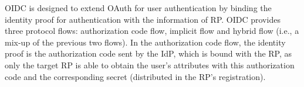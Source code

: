 

OIDC is designed to extend OAuth for user authentication by binding the identity proof for authentication with the information of RP. OIDC provides three protocol flows: authorization code flow, implicit flow and hybrid flow (i.e., a mix-up of the previous two flows). In the authorization code flow, the identity proof is the authorization code sent by the IdP, which is bound with the RP, as only the target RP is able to obtain the user's attributes with this authorization code and the corresponding secret (distributed in the RP's registration).

